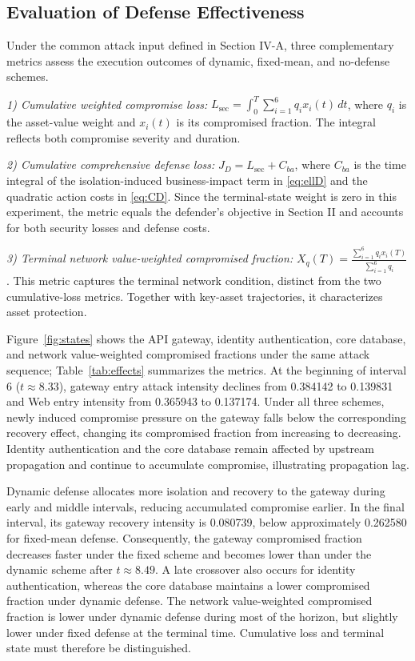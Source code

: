 \documentclass[conference,letterpaper]{IEEEtran}
\begin{document}
\subsection{Evaluation of Defense Effectiveness}
Under the common attack input defined in Section IV-A, three complementary metrics assess the execution outcomes of dynamic, fixed-mean, and no-defense schemes.

\emph{1) Cumulative weighted compromise loss:} $L_{\mathrm{sec}}=\int_0^T\sum_{i=1}^6q_i x_i(t)\,dt$, where $q_i$ is the asset-value weight and $x_i(t)$ is its compromised fraction. The integral reflects both compromise severity and duration.

\emph{2) Cumulative comprehensive defense loss:} $J_D=L_{\mathrm{sec}}+C_{ba}$, where $C_{ba}$ is the time integral of the isolation-induced business-impact term in \eqref{eq:ellD} and the quadratic action costs in \eqref{eq:CD}. Since the terminal-state weight is zero in this experiment, the metric equals the defender's objective in Section II and accounts for both security losses and defense costs.

\emph{3) Terminal network value-weighted compromised fraction:} $X_q(T)=\frac{\sum_{i=1}^6 q_i x_i(T)}{\sum_{i=1}^6q_i}$. This metric captures the terminal network condition, distinct from the two cumulative-loss metrics. Together with key-asset trajectories, it characterizes asset protection.

Figure~\ref{fig:states} shows the API gateway, identity authentication, core database, and network value-weighted compromised fractions under the same attack sequence; Table~\ref{tab:effects} summarizes the metrics. At the beginning of interval 6 ($t\approx8.33$), gateway entry attack intensity declines from 0.384142 to 0.139831 and Web entry intensity from 0.365943 to 0.137174. Under all three schemes, newly induced compromise pressure on the gateway falls below the corresponding recovery effect, changing its compromised fraction from increasing to decreasing. Identity authentication and the core database remain affected by upstream propagation and continue to accumulate compromise, illustrating propagation lag.

Dynamic defense allocates more isolation and recovery to the gateway during early and middle intervals, reducing accumulated compromise earlier. In the final interval, its gateway recovery intensity is 0.080739, below approximately 0.262580 for fixed-mean defense. Consequently, the gateway compromised fraction decreases faster under the fixed scheme and becomes lower than under the dynamic scheme after $t\approx8.49$. A late crossover also occurs for identity authentication, whereas the core database maintains a lower compromised fraction under dynamic defense. The network value-weighted compromised fraction is lower under dynamic defense during most of the horizon, but slightly lower under fixed defense at the terminal time. Cumulative loss and terminal state must therefore be distinguished.
\end{document}
